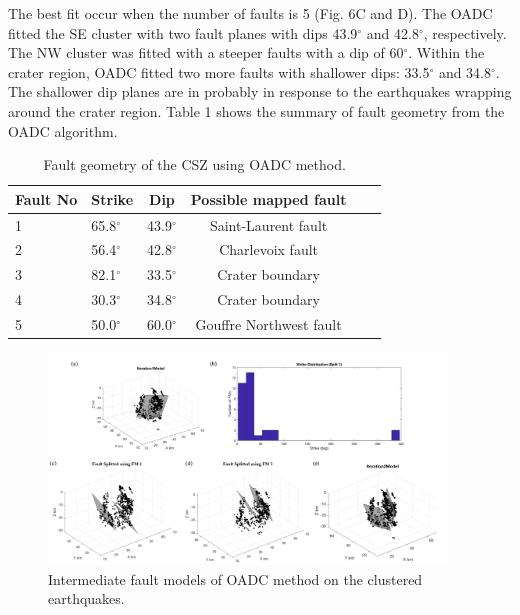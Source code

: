 \documentclass[draft]{agujournal2018}
\begin{document}
The best fit occur when the number of faults is 5 (Fig. 6C and D). The OADC fitted the SE cluster with two fault planes with dips 43.9$^\circ$ and 42.8$^\circ$, respectively. The NW cluster was fitted with a steeper faults with a dip of 60$^\circ$. Within the crater region, OADC fitted two more faults with shallower dips: 33.5$^\circ$ and 34.8$^\circ$. The shallower dip planes are in probably in response to the earthquakes wrapping around the crater region. Table 1 shows the summary of fault geometry from the OADC algorithm.



    \begin{table}
    \caption{Fault geometry of the CSZ using OADC method.}
    \centering
    \begin{tabular}{llcccc}
    \hline
    Fault No & Strike & Dip & Possible mapped fault \\
    \hline
    1 & 65.8$^\circ$ & 43.9$^\circ$ & Saint-Laurent fault \\
    2 & 56.4$^\circ$ & 42.8$^\circ$ & Charlevoix fault \\
    3 & 82.1$^\circ$ & 33.5$^\circ$ & Crater boundary \\
    4 & 30.3$^\circ$ & 34.8$^\circ$ & Crater boundary \\
    5 & 50.0$^\circ$ & 60.0$^\circ$ & Gouffre Northwest fault\\
    \hline
    \end{tabular}
    \label{tableone}
    \end{table}


\begin{figure}[ht]
\centering
\includegraphics[width=25pc]{Figures/OADC_fig_1.png}
\caption{Intermediate fault models of OADC method on the clustered earthquakes.}
\label{figsix}
\end{figure}
\end{document}
